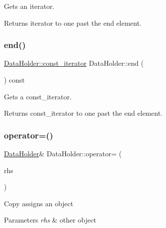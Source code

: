 Gets an iterator. \begin{DoxyReturn}{Returns}
iterator to one past the end element. 
\end{DoxyReturn}
\mbox{\label{classDataHolder_a57f9f124e39a09c87bdc789fa376cb56}} 
\subsubsection{\texorpdfstring{end()}{end()}\hspace{0.1cm}{\footnotesize\ttfamily [2/2]}}
{\footnotesize\ttfamily \hyperlink{classDataHolder_a6284772630d15867fe5549a2903944cd}{Data\+Holder\+::const\+\_\+iterator} Data\+Holder\+::end (\begin{DoxyParamCaption}{ }\end{DoxyParamCaption}) const}

Gets a const\+\_\+iterator. \begin{DoxyReturn}{Returns}
const\+\_\+iterator to one past the end element. 
\end{DoxyReturn}
\mbox{\label{classDataHolder_a3034e2aa41d6dfefcf4e60cc76bc555b}} 
\subsubsection{\texorpdfstring{operator=()}{operator=()}\hspace{0.1cm}{\footnotesize\ttfamily [1/2]}}
{\footnotesize\ttfamily \hyperlink{classDataHolder}{Data\+Holder}\& Data\+Holder\+::operator= (\begin{DoxyParamCaption}\item[{const \hyperlink{classDataHolder}{Data\+Holder} \&}]{rhs }\end{DoxyParamCaption})\hspace{0.3cm}{\ttfamily [default]}}

Copy assigns an object 
\begin{DoxyParams}{Parameters}
{\em rhs} & other object \\
\hline
\end{DoxyParams}
\mbox{\label{classDataHolder_a16dcf3489a359c8f9c172f5178c6776f}} 
